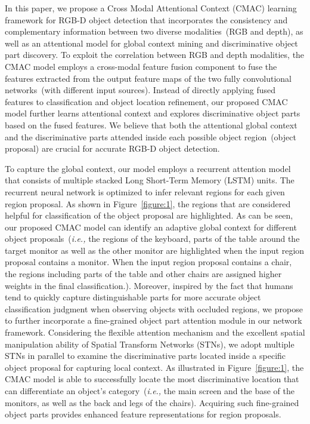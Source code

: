 \documentclass[journal]{IEEEtran}
\begin{document}
In this paper, we propose a Cross Modal Attentional Context (CMAC) learning framework for RGB-D object detection that incorporates the consistency and complementary information between two diverse modalities~(RGB and depth), as well as an attentional model for global context mining and discriminative object part discovery. To exploit the correlation between RGB and depth modalities, the CMAC model employs a cross-modal feature fusion component to fuse the features extracted from the output feature maps of the two fully convolutional networks~(with different input sources). Instead of directly applying fused features to classification and object location refinement, our proposed CMAC model further learns attentional context and explores discriminative object parts based on the fused features. We believe that both the attentional global context and the discriminative parts attended inside each possible object region~(object proposal) are crucial for accurate RGB-D object detection. 

To capture the global context, our model employs a recurrent attention model that consists of multiple stacked Long Short-Term Memory (LSTM) units. The recurrent neural network is optimized to infer relevant regions for each given region proposal. As shown in Figure~\ref{figure:1}, the regions that are considered helpful for classification of the object proposal are highlighted. As can be seen, our proposed CMAC model can identify an adaptive global context for different object proposals~(\textit{i.e.,} the regions of the keyboard, parts of the table around the target monitor as well as the other monitor are highlighted when the input region proposal contains a monitor. When the input region proposal contains a chair, the regions including parts of the table and other chairs are assigned higher weights in the final classification.). Moreover, inspired by the fact that 
humans tend to quickly capture distinguishable parts for more accurate object classification judgment when observing objects with occluded regions, we propose to further incorporate a fine-grained object part attention module in our network framework. Considering the flexible attention mechanism and the excellent spatial manipulation ability of Spatial Transform Networks (STNs), we adopt multiple STNs in parallel to examine the discriminative parts located inside a specific object proposal for capturing local context. As illustrated in Figure~\ref{figure:1}, the CMAC model is able to successfully locate the most discriminative location that can differentiate an object's category~(\textit{i.e.,} the main screen and the base of the monitors, as well as the back and legs of the chairs). Acquiring such fine-grained object parts provides enhanced feature representations for region proposals.
\end{document}
